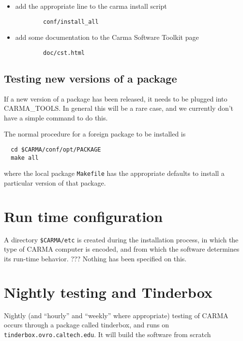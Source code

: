 \documentclass{article}
\begin{document}
\begin{itemize}
\item                                                                                       
add the appropriate line to the carma install script
\begin{verbatim}                                                                                   
        conf/install_all
\end{verbatim}
\item                                                                                       
add some documentation to the Carma Software Toolkit page 
\begin{verbatim}
        doc/cst.html
\end{verbatim}
\end{itemize}

\subsection{Testing new versions of a package}

If a new version of a package has been released, it needs to be plugged
into CARMA\_TOOLS. In general this will be a rare case, and we
currently don't have a simple command to do this. 

The normal
procedure for a foreign package to be installed is
\begin{verbatim}
  cd $CARMA/conf/opt/PACKAGE
  make all
\end{verbatim} %

where the local package {\tt Makefile} has the appropriate defaults to
install a particular version of that package.


\section{Run time configuration}

A directory {\tt \$CARMA/etc} is created during the installation
process, in which the type of CARMA computer is encoded, and from
which the software determines its run-time behavior. ???
Nothing has been specified on this.

\section{Nightly testing and Tinderbox}

Nightly (and ``hourly'' and ``weekly'' where appropriate) 
testing of CARMA occurs through a package called 
tinderbox, and runs on {\tt tinderbox.ovro.caltech.edu}. It will
build the software from scratch
\end{document}
